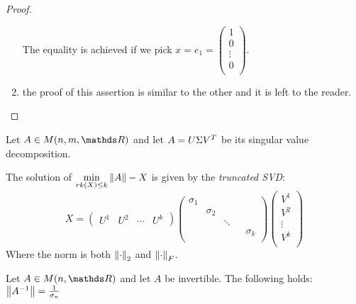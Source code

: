 \documentclass[ComputationalMathematics.tex]{subfiles}
\begin{document}
\begin{proof}
\begin{enumerate}
  The equality is achieved if we pick $x = e_1 = \begin{pmatrix}
    1\\
    0\\
    \vdots\\
    0\\
  \end{pmatrix}$.
    \item the proof of this assertion is similar to the other and it is left to the reader.
    \end{enumerate}
\end{proof}

\begin{theorem}
  Let $A \in M(n, m, \R)$ and let $A = U \Sigma {V}^{T}$ be its singular value decomposition.

  The solution of $\min\limits_{rk(X) \le k} \left\lVert A\right\rVert-X$ is given by the \emph{truncated SVD}:
  \[
    X = \begin{pmatrix}
      U^1 & U^2 & \cdots & U^k
    \end{pmatrix}
    \begin{pmatrix}
    \sigma_1\\
    & \sigma_2\\
    && \ddots\\
    &&&& \sigma_k\\
    \end{pmatrix}
    \begin{pmatrix}
      V^1\\
      V^2\\
      \vdots\\
      V^k\\
    \end{pmatrix}
  \]
  Where the norm is both $\left\lVert\cdot\right\rVert_2$ and $\left\lVert\cdot\right\rVert_F$.
\end{theorem}

\begin{proposition}
  Let $A \in M(n, \R)$ and let $A$ be invertible. The following holds:
$  \left\lVert{A}^{-1}\right\rVert = \frac{1}{\sigma_n}$
\end{proposition}
\end{document}
